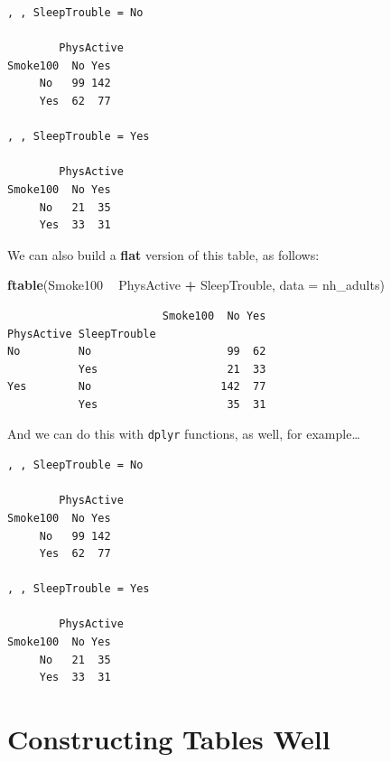 \documentclass[
]{book}
\newenvironment{Shaded}{\begin{snugshade}}{\end{snugshade}}
\newcommand{\DataTypeTok}[1]{\textcolor[rgb]{0.13,0.29,0.53}{#1}}
\newcommand{\KeywordTok}[1]{\textcolor[rgb]{0.13,0.29,0.53}{\textbf{#1}}}
\newcommand{\NormalTok}[1]{#1}
\newcommand{\OperatorTok}[1]{\textcolor[rgb]{0.81,0.36,0.00}{\textbf{#1}}}
\newcommand{\StringTok}[1]{\textcolor[rgb]{0.31,0.60,0.02}{#1}}
\begin{document}
\begin{verbatim}
, , SleepTrouble = No

        PhysActive
Smoke100  No Yes
     No   99 142
     Yes  62  77

, , SleepTrouble = Yes

        PhysActive
Smoke100  No Yes
     No   21  35
     Yes  33  31
\end{verbatim}

We can also build a \textbf{flat} version of this table, as follows:

\begin{Shaded}
\begin{Highlighting}[]
\KeywordTok{ftable}\NormalTok{(Smoke100 }\OperatorTok{~}\StringTok{ }\NormalTok{PhysActive }\OperatorTok{+}\StringTok{ }\NormalTok{SleepTrouble, }\DataTypeTok{data =}\NormalTok{ nh_adults)}
\end{Highlighting}
\end{Shaded}

\begin{verbatim}
                        Smoke100  No Yes
PhysActive SleepTrouble                 
No         No                     99  62
           Yes                    21  33
Yes        No                    142  77
           Yes                    35  31
\end{verbatim}

And we can do this with \texttt{dplyr} functions, as well, for example\ldots{}

\begin{Shaded}
\end{Shaded}

\begin{verbatim}
, , SleepTrouble = No

        PhysActive
Smoke100  No Yes
     No   99 142
     Yes  62  77

, , SleepTrouble = Yes

        PhysActive
Smoke100  No Yes
     No   21  35
     Yes  33  31
\end{verbatim}

\hypertarget{constructing-tables-well}{%
\section{Constructing Tables Well}\label{constructing-tables-well}}
\end{document}
